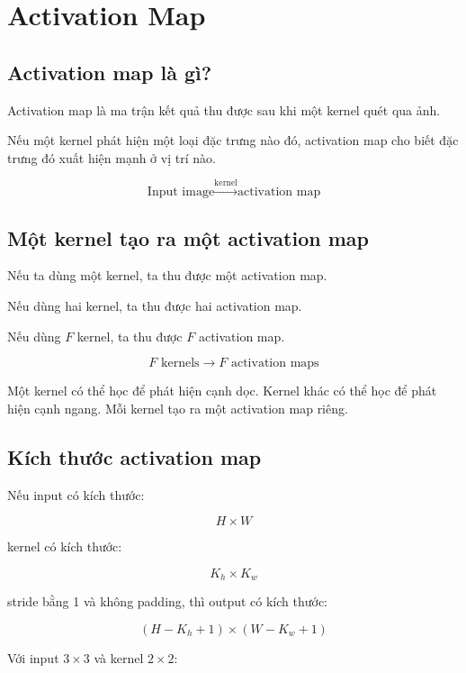 \documentclass[12pt,a4paper]{report}
\begin{document}
\chapter{Activation Map}

\section{Activation map là gì?}

Activation map là ma trận kết quả thu được sau khi một kernel quét qua ảnh.

Nếu một kernel phát hiện một loại đặc trưng nào đó, activation map cho biết đặc trưng đó xuất hiện mạnh ở vị trí nào.

\[
    \text{Input image}
    \xrightarrow{\text{kernel}}
    \text{activation map}
\]

\section{Một kernel tạo ra một activation map}

Nếu ta dùng một kernel, ta thu được một activation map.

Nếu dùng hai kernel, ta thu được hai activation map.

Nếu dùng $F$ kernel, ta thu được $F$ activation map.

\[
    F \text{ kernels}
    \rightarrow
    F \text{ activation maps}
\]

\begin{vidu}
Một kernel có thể học để phát hiện cạnh dọc. Kernel khác có thể học để phát hiện cạnh ngang. Mỗi kernel tạo ra một activation map riêng.
\end{vidu}

\section{Kích thước activation map}

Nếu input có kích thước:

\[
    H \times W
\]

kernel có kích thước:

\[
    K_h \times K_w
\]

stride bằng 1 và không padding, thì output có kích thước:

\[
    (H-K_h+1) \times (W-K_w+1)
\]

Với input $3\times3$ và kernel $2\times2$:
\end{document}

